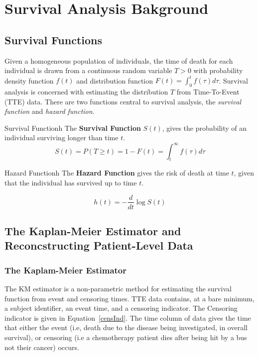 \chapter{Survival Analysis Bakground}\label{survchap}

\section{Survival Functions}

Given a homogeneous population of individuals, the time of death for each individual is drawn from a continuous random variable $T > 0$ with probability density function $f(t)$ and distribution function $F(t) = \int_{0}^{t}f(\tau)d\tau$. Survival analysis is concerned with estimating the distribution $T$ from Time-To-Event (TTE) data. There are two functions central to survival analysis, the \textit{survival function} and \textit{hazard function}.

\begin{definition}{Survival Function}{h}
    The \textbf{Survival Function} $S(t)$, gives the probability of an individual surviving longer than time $t$. 
    \[
        S(t) = P(T \geq  t) = 1 - F(t) = \int_{t}^{\infty}f(\tau)d\tau  
    \]
\end{definition}

\begin{definition}{Hazard Function}{h}
    The \textbf{Hazard Function} gives the risk of death at time $t$, given that the individual has survived up to time $t$. 
    
    \[
        h(t) = -\frac{d}{dt}\log S(t)  
    \]
\end{definition}

\section{The Kaplan-Meier Estimator and Reconcstructing Patient-Level Data}
\subsection{The Kaplam-Meier Estimator}
The KM estimator is a non-parametric method for estimating the survival function from event and censoring times. TTE data contains, at a bare minimum, a subject identifier, an event time, and a censoring indicator. The Censoring indicator is given in Equation~\ref{censInd}. The time column of data gives the time that either the event (i.e, death due to the disease being investigated, in overall survival), or censoring (i.e a chemotherapy patient dies after being hit by a bus not their cancer) occurs.

